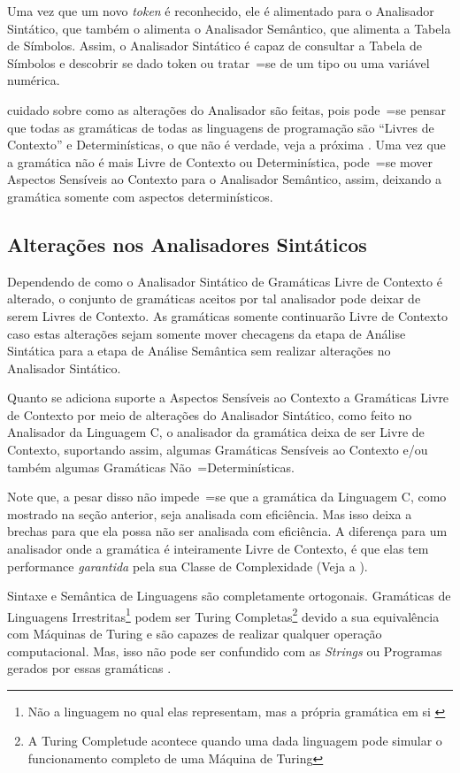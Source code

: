 Uma vez que um novo \textit{token} é reconhecido,
ele é alimentado para o Analisador Sintático,
que também o alimenta o Analisador Semântico,
que alimenta a Tabela de Símbolos.
Assim,
o Analisador Sintático é capaz de consultar a Tabela de Símbolos \cite{ahoCompilerDragonBook} e
descobrir se dado token ou
tratar~=se de um tipo ou
uma variável numérica.

 cuidado sobre como as alterações do Analisador são feitas,
pois pode~=se pensar que todas as gramáticas de todas as linguagens de programação são ``Livres de Contexto'' e
Determinísticas,
o que não é verdade,
veja a próxima .
Uma vez que a gramática não é mais Livre de Contexto ou
Determinística,
pode~=se mover Aspectos Sensíveis ao Contexto para o Analisador Semântico,
assim,
deixando a gramática somente com aspectos determinísticos.


\subsection{Alterações nos Analisadores Sintáticos}
\label{alteracoesNosAnalisadoresSintaticos}

Dependendo de como o Analisador Sintático de Gramáticas Livre de Contexto é alterado,
o conjunto de gramáticas aceitos por tal analisador pode deixar de serem Livres de Contexto.
As gramáticas somente continuarão Livre de Contexto caso estas alterações sejam somente mover checagens da etapa de Análise Sintática para a etapa de Análise Semântica sem realizar alterações no Analisador Sintático.

Quanto se adiciona suporte a Aspectos Sensíveis ao Contexto \cite{contextSensitiveParsing} a Gramáticas Livre de Contexto por meio de alterações do Analisador Sintático,
como feito no Analisador da Linguagem C,
o analisador da gramática deixa de ser Livre de Contexto,
suportando assim,
algumas Gramáticas Sensíveis ao Contexto e\slash{}ou também algumas Gramáticas Não~=Determinísticas.

Note que,
a pesar disso não impede~=se que a gramática da Linguagem C,
como mostrado na seção anterior,
seja analisada com eficiência.
Mas isso deixa a brechas para que ela possa não ser analisada com eficiência.
A diferença para um analisador onde a gramática é inteiramente Livre de Contexto,
é que elas tem performance \textit{garantida} pela sua Classe de Complexidade (Veja a ).

Sintaxe e
Semântica de Linguagens são completamente ortogonais.
Gramáticas de Linguagens Irrestritas\footnote{
Não a linguagem no qual elas representam,
mas a própria gramática em si \cite{finiteAutomataTuringComplete}
}
podem ser Turing Completas\footnote{
A Turing Completude acontece quando uma dada linguagem pode simular o funcionamento completo de uma Máquina de Turing
}
devido a sua equivalência com Máquinas de Turing e
são capazes de realizar qualquer operação computacional.
Mas,
isso não pode ser confundido com as \textit{Strings} ou
Programas gerados por essas gramáticas \cite{areThereDomainSpecificLanguages}.

